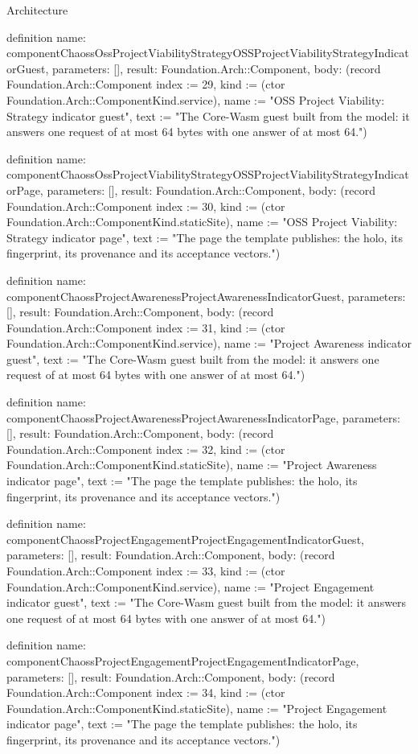 \begin{lexlean}{Architecture}
\begin{semanticmodule}
definition{
  name: componentChaossOssProjectViabilityStrategyOSSProjectViabilityStrategyIndicatorGuest,
  parameters: [],
  result: Foundation.Arch::Component,
  body: (record Foundation.Arch::Component {index := 29, kind := (ctor Foundation.Arch::ComponentKind.service), name := "OSS Project Viability: Strategy indicator guest", text := "The Core-Wasm guest built from the model: it answers one request of at most 64 bytes with one answer of at most 64."})
}

definition{
  name: componentChaossOssProjectViabilityStrategyOSSProjectViabilityStrategyIndicatorPage,
  parameters: [],
  result: Foundation.Arch::Component,
  body: (record Foundation.Arch::Component {index := 30, kind := (ctor Foundation.Arch::ComponentKind.staticSite), name := "OSS Project Viability: Strategy indicator page", text := "The page the template publishes: the holo, its fingerprint, its provenance and its acceptance vectors."})
}

definition{
  name: componentChaossProjectAwarenessProjectAwarenessIndicatorGuest,
  parameters: [],
  result: Foundation.Arch::Component,
  body: (record Foundation.Arch::Component {index := 31, kind := (ctor Foundation.Arch::ComponentKind.service), name := "Project Awareness indicator guest", text := "The Core-Wasm guest built from the model: it answers one request of at most 64 bytes with one answer of at most 64."})
}

definition{
  name: componentChaossProjectAwarenessProjectAwarenessIndicatorPage,
  parameters: [],
  result: Foundation.Arch::Component,
  body: (record Foundation.Arch::Component {index := 32, kind := (ctor Foundation.Arch::ComponentKind.staticSite), name := "Project Awareness indicator page", text := "The page the template publishes: the holo, its fingerprint, its provenance and its acceptance vectors."})
}

definition{
  name: componentChaossProjectEngagementProjectEngagementIndicatorGuest,
  parameters: [],
  result: Foundation.Arch::Component,
  body: (record Foundation.Arch::Component {index := 33, kind := (ctor Foundation.Arch::ComponentKind.service), name := "Project Engagement indicator guest", text := "The Core-Wasm guest built from the model: it answers one request of at most 64 bytes with one answer of at most 64."})
}

definition{
  name: componentChaossProjectEngagementProjectEngagementIndicatorPage,
  parameters: [],
  result: Foundation.Arch::Component,
  body: (record Foundation.Arch::Component {index := 34, kind := (ctor Foundation.Arch::ComponentKind.staticSite), name := "Project Engagement indicator page", text := "The page the template publishes: the holo, its fingerprint, its provenance and its acceptance vectors."})
}


\end{semanticmodule}
\end{lexlean}
